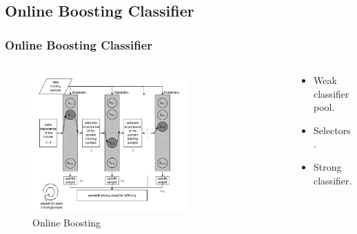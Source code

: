 \documentclass{beamer}
\begin{document}
\subsection{Online Boosting Classifier}
\begin{frame}
	\frametitle{Online Boosting Classifier\scriptsize\cite{Grabner:2006:OBV:1153170.1153451}}
	\begin{columns}[T]
		\begin{column}{0.6\textwidth}
		\begin{figure}
		\begin{center}
			\includegraphics[width=0.7\textwidth]{images/OnlineBoosting.png}
			\caption{Online Boosting}
		\end{center}
		\end{figure}
		\end{column}
		\begin{column}{0.4\textwidth}
			\begin{itemize}
				\item Weak classifier pool.
				\item Selectors.
				\item Strong classifier.
			\end{itemize}
		\end{column}
	\end{columns}
\end{frame}
\end{document}
